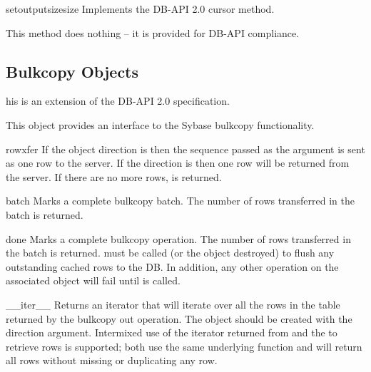 \begin{methoddesc}[Cursor]{setoutputsize}{size }
Implements the DB-API 2.0 cursor  method.

This method does nothing -- it is provided for DB-API compliance.
\end{methoddesc}

\subsection{Bulkcopy Objects}

his is an extension of the DB-API 2.0 specification.

This object provides an interface to the Sybase bulkcopy
functionality.

\begin{methoddesc}[Bulkcopy]{rowxfer}{}
If the  object direction is  then the
sequence passed as the  argument is sent as one row to the
server.  If the direction is  then one row will be
returned from the server. If there are no more rows,  is returned.
\end{methoddesc}

\begin{methoddesc}[Bulkcopy]{batch}{}
Marks a complete bulkcopy batch.  The number of rows transferred in
the batch is returned.
\end{methoddesc}

\begin{methoddesc}[Bulkcopy]{done}{}
Marks a complete bulkcopy operation.  The number of rows transferred
in the batch is returned.   must be called (or the
 object destroyed) to flush any outstanding cached rows
to the DB.  In addition, any other operation on the associated
 object will fail until  is called.

\end{methoddesc}

\begin{methoddesc}[Bulkcopy]{__iter__}{} Returns an iterator that will
iterate over all the rows in the table returned by the bulkcopy out
operation.  The  object should be created with the
 direction argument.  Intermixed use of the iterator
returned from  and the  to
retrieve rows is supported; both use the same underlying function and
will return all rows without missing or duplicating any row.

\end{methoddesc}

